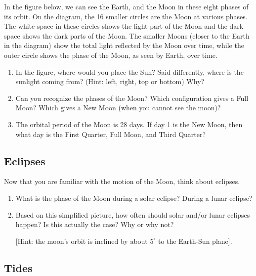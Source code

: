 \documentclass[12pt]{article}%
\begin{document}
In the figure below, we can see the Earth, and the Moon in these eight phases of its orbit. On the diagram, the 16 smaller circles are the Moon at various phases. The white space in these circles shows the light part of the Moon and the dark space shows the dark parts of the Moon. The smaller Moons (closer to the Earth in the diagram) show the total light reflected by the Moon over time, while the outer circle shows the phase of the Moon, as seen by Earth, over time. 




\begin{enumerate}
\item In the figure, where would you place the Sun? Said differently, where is the sunlight coming from? (Hint: left, right, top or bottom) Why?

\item Can you recognize the phases of the Moon? Which configuration gives a Full Moon? Which gives a New Moon (when you cannot see the moon)? 

\item The orbital period of the Moon is 28 days. If day 1 is the New Moon, then what day is the First Quarter, Full Moon, and Third Quarter?

\end{enumerate}



\subsection{Eclipses}
Now that you are familiar with the motion of the Moon, think about eclipses.
\begin{enumerate}

    \item What is the phase of the Moon during a solar eclipse? During a lunar eclipse?
    
    \item Based on this simplified picture, how often should solar and/or lunar eclipses happen? Is this actually the case? Why or why not?
    
    [Hint: the moon's orbit is inclined by about $5^{\circ}$ to the Earth-Sun plane].
    
\end{enumerate}


\pagebreak
\subsection{Tides}
\end{document}
